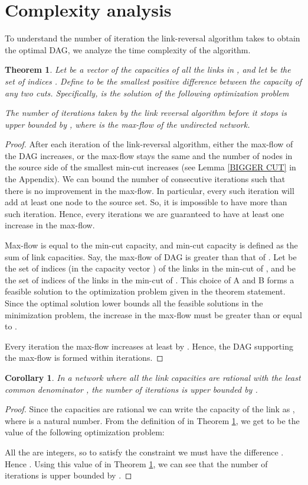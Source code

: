 \documentclass{sig-alternate-2013}
\newtheorem{theorem}{Theorem}
\newtheorem{corollary}{Corollary}
\begin{document}
\section{Complexity analysis} \label{sec:complexity}
To understand the number of iteration the link-reversal algorithm takes to obtain the optimal DAG, we analyze the time complexity of the algorithm. 
\begin{theorem}\label{thm:complexity}
Let  be a vector of  the capacities of all the links in , and let  be the set of indices .  Define  to be the smallest positive difference between the capacity of any two cuts. Specifically,  is the solution  of the following optimization problem

The number of iterations taken by the link reversal algorithm before it stops is upper bounded by  , where  is the max-flow of the undirected network.
\end{theorem}
\begin{proof}
After each iteration of the link-reversal algorithm, either the max-flow of the DAG  increases, or the max-flow stays the same and the number of nodes in the source side of the smallest min-cut increases (see Lemma \ref{BIGGER CUT} in the Appendix). We can bound the number of consecutive iterations such that there is no improvement in the max-flow. In particular, every such iteration will add at least one node to the source set. So, it is impossible to have more than  such iteration. Hence, every  iterations we are guaranteed to have at least one increase in the max-flow.

Max-flow is equal to the min-cut capacity, and min-cut capacity is defined as the sum of link capacities. Say, the max-flow of DAG  is greater than that of . Let  be the set of indices (in the capacity vector ) of the links  in the min-cut of  , and  be the set of indices of the links in the min-cut of . This choice of A and B forms a feasible solution to the optimization problem given in the theorem statement. Since the optimal solution  lower bounds all the feasible solutions in the minimization problem, the increase in the max-flow must be greater than or equal to . 

Every  iteration the max-flow increases at least by . Hence, the DAG supporting the max-flow  is formed within  iterations.
\end{proof}

\begin{corollary} \label{cor:integer}
In a network where all the link capacities are rational with the least common denominator , the number of iterations is upper bounded by .
\end{corollary}
\begin{proof}
Since the capacities are rational we can write the capacity of the  link as , where  is a natural number. From the definition of  in Theorem \ref{thm:complexity}, we get  to be the value of the following optimization problem:

All the  are integers, so to satisfy the constraint we must have the difference . Hence . Using this value of  in Theorem \ref{thm:complexity}, we can see that the number of iterations is upper bounded by .
\end{proof}
\end{document}
